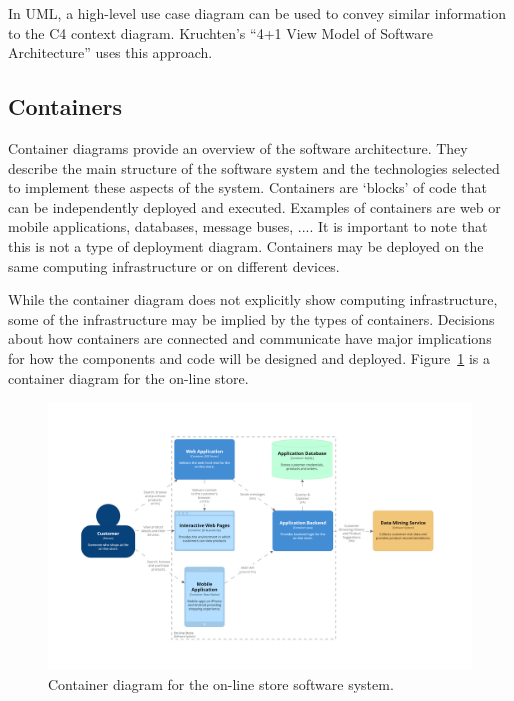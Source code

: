 In UML, a high-level use case diagram can be used to convey similar information to the C4 context diagram.
Kruchten's ``4+1 View Model of Software Architecture'' \cite{4+1-model} uses this approach.

\subsection{Containers}
Container diagrams provide an overview of the software architecture.
They describe the main structure of the software system and the technologies selected to implement these aspects of the system.
Containers are `blocks' of code that can be independently deployed and executed.
Examples of containers are web or mobile applications, databases, message buses, ....
It is important to note that this is not a type of deployment diagram.
Containers may be deployed on the same computing infrastructure or on different devices.

While the container diagram does not explicitly show computing infrastructure, some of the infrastructure may be implied by the types of containers.
Decisions about how containers are connected and communicate have major implications for how the components and code will be designed and deployed.
Figure~\ref{fig:c4_container_store} is a container diagram for the on-line store.

\begin{figure}[h!]
    \centering
    \begin{adjustwidth}{-9mm}{-9mm}
        \includegraphics[trim=250 226 286 258,clip,width=0.96\paperwidth]{images/c4/store_container_diagram.png}
    \end{adjustwidth}
    \caption{Container diagram for the on-line store software system.}
    \label{fig:c4_container_store}
\end{figure}

